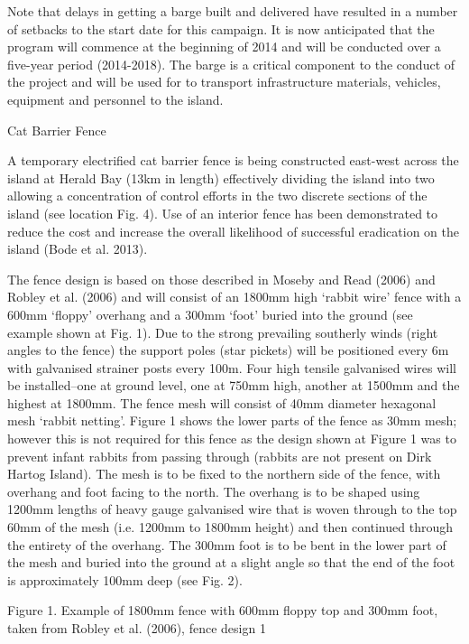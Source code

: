 \documentclass[version=last,
    paper=a4,                               %
    10pt,                                   %
    dvipsnames,
    oneside,                              %
    headings=openany,                       %
    open=any,
    BCOR=7mm,                               %
    DIV=15,     %
]{scrbook}
\begin{document}
Note that delays in getting a barge built and delivered have resulted in
a number of setbacks to the start date for this campaign. It is now
anticipated that the program will commence at the beginning of 2014 and
will be conducted over a five-year period (2014-2018). The barge is a
critical component to the conduct of the project and will be used for to
transport infrastructure materials, vehicles, equipment and personnel to
the island.

Cat Barrier Fence

A temporary electrified cat barrier fence is being constructed east-west
across the island at Herald Bay (13km in length) effectively dividing
the island into two allowing a concentration of control efforts in the
two discrete sections of the island (see location Fig. 4). Use of an
interior fence has been demonstrated to reduce the cost and increase the
overall likelihood of successful eradication on the island (Bode et al.
2013).

The fence design is based on those described in Moseby and Read (2006)
and Robley et al. (2006) and will consist of an 1800mm high `rabbit
wire' fence with a 600mm `floppy' overhang and a 300mm `foot' buried
into the ground (see example shown at Fig. 1). Due to the strong
prevailing southerly winds (right angles to the fence) the support poles
(star pickets) will be positioned every 6m with galvanised strainer
posts every 100m. Four high tensile galvanised wires will be
installed--one at ground level, one at 750mm high, another at 1500mm and
the highest at 1800mm. The fence mesh will consist of 40mm diameter
hexagonal mesh `rabbit netting'. Figure 1 shows the lower parts of the
fence as 30mm mesh; however this is not required for this fence as the
design shown at Figure 1 was to prevent infant rabbits from passing
through (rabbits are not present on Dirk Hartog Island). The mesh is to
be fixed to the northern side of the fence, with overhang and foot
facing to the north. The overhang is to be shaped using 1200mm lengths
of heavy gauge galvanised wire that is woven through to the top 60mm of
the mesh (i.e. 1200mm to 1800mm height) and then continued through the
entirety of the overhang. The 300mm foot is to be bent in the lower part
of the mesh and buried into the ground at a slight angle so that the end
of the foot is approximately 100mm deep (see Fig. 2).

Figure 1. Example of 1800mm fence with 600mm floppy top and 300mm foot,
taken from Robley et al. (2006), fence design 1
\end{document}
